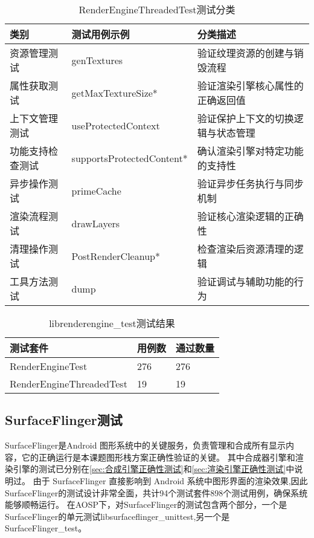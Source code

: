 \begin{table}[h]
    \centering
    \caption{RenderEngineThreadedTest测试分类}
    \label{tab:RenderEngineThreadedTest测试分类}
    \begin{tabular}{lll}
      \toprule
      类别 & 测试用例示例 & 分类描述 \\
      \midrule
      资源管理测试 & genTextures & 验证纹理资源的创建与销毁流程 \\
      属性获取测试 & getMaxTextureSize* & 验证渲染引擎核心属性的正确返回值 \\
      上下文管理测试 & useProtectedContext & 验证保护上下文的切换逻辑与状态管理 \\
      功能支持检查测试 & supportsProtectedContent* & 确认渲染引擎对特定功能的支持性 \\
      异步操作测试 & primeCache & 验证异步任务执行与同步机制 \\
      渲染流程测试 & drawLayers & 验证核心渲染逻辑的正确性 \\
      清理操作测试 & PostRenderCleanup* & 检查渲染后资源清理的逻辑 \\
      工具方法测试 & dump & 验证调试与辅助功能的行为 \\
      \bottomrule
    \end{tabular}
    \note{}
\end{table}

\begin{table}[h]
    \centering
    \caption{librenderengine\_test测试结果}
    \label{tab:librenderengine_test测试结果}
    \begin{tabular}{lll}
      \toprule
      测试套件 & 用例数 & 通过数量 \\
      \midrule
      RenderEngineTest & 276 & 276 \\
      RenderEngineThreadedTest & 19 & 19 \\
      \bottomrule
    \end{tabular}
    \note{}
\end{table}

\subsection{SurfaceFlinger测试}
SurfaceFlinger是Android 图形系统中的关键服务，负责管理和合成所有显示内容，它的正确运行是本课题图形栈方案正确性验证的关键。
其中合成器引擎和渲染引擎的测试已分别在\ref{sec:合成引擎正确性测试}和\ref{sec:渲染引擎正确性测试}中说明过。
由于 SurfaceFlinger 直接影响到 Android 系统中图形界面的渲染效果,因此SurfaceFlinger的测试设计非常全面，共计94个测试套件898个测试用例，确保系统能够顺畅运行。
在AOSP下，对SurfaceFlinger的测试包含两个部分，一个是SurfaceFlinger的单元测试libsurfaceflinger\_unittest,另一个是SurfaceFlinger\_test。

